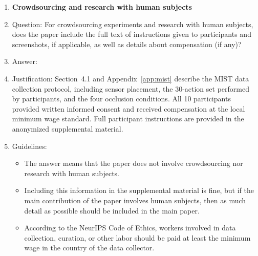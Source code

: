 \begin{enumerate}
\item {\bf Crowdsourcing and research with human subjects}
    \item[] Question: For crowdsourcing experiments and research with human subjects, does the paper include the full text of instructions given to participants and screenshots, if applicable, as well as details about compensation (if any)?
    \item[] Answer: \answerYes{}
    \item[] Justification: Section~4.1 and Appendix~\ref{app:mist} describe the MIST data collection protocol, including sensor placement, the 30-action set performed by participants, and the four occlusion conditions. All 10 participants provided written informed consent and received compensation at the local minimum wage standard. Full participant instructions are provided in the anonymized supplemental material.
    \item[] Guidelines:
    \begin{itemize}
        \item The answer \answerNA{} means that the paper does not involve crowdsourcing nor research with human subjects.
        \item Including this information in the supplemental material is fine, but if the main contribution of the paper involves human subjects, then as much detail as possible should be included in the main paper.
        \item According to the NeurIPS Code of Ethics, workers involved in data collection, curation, or other labor should be paid at least the minimum wage in the country of the data collector.
    \end{itemize}


\end{enumerate}
